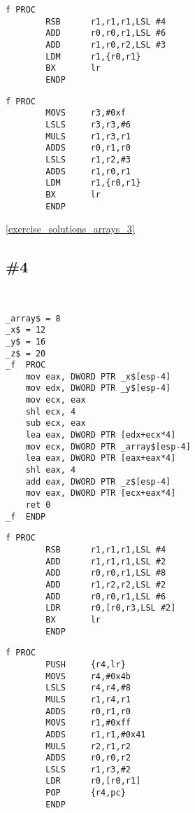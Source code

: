 \begin{lstlisting}[caption=\NonOptimizingKeilVI (\ARMMode)]
f PROC
        RSB      r1,r1,r1,LSL #4
        ADD      r0,r0,r1,LSL #6
        ADD      r1,r0,r2,LSL #3
        LDM      r1,{r0,r1}
        BX       lr
        ENDP
\end{lstlisting}

\begin{lstlisting}[caption=\NonOptimizingKeilVI (\ThumbMode)]
f PROC
        MOVS     r3,#0xf
        LSLS     r3,r3,#6
        MULS     r1,r3,r1
        ADDS     r0,r1,r0
        LSLS     r1,r2,#3
        ADDS     r1,r0,r1
        LDM      r1,{r0,r1}
        BX       lr
        ENDP
\end{lstlisting}

\Answer\: \ref{exercise_solutions_arrays_3}

\subsection{\Exercise \#4}
\label{exercise_array_4}

\WhatThisCodeDoes\


\begin{lstlisting}[caption=\Optimizing MSVC 2010]
_array$ = 8	
_x$ = 12	
_y$ = 16	
_z$ = 20	
_f	PROC
	mov	eax, DWORD PTR _x$[esp-4]
	mov	edx, DWORD PTR _y$[esp-4]
	mov	ecx, eax
	shl	ecx, 4
	sub	ecx, eax
	lea	eax, DWORD PTR [edx+ecx*4]
	mov	ecx, DWORD PTR _array$[esp-4]
	lea	eax, DWORD PTR [eax+eax*4]
	shl	eax, 4
	add	eax, DWORD PTR _z$[esp-4]
	mov	eax, DWORD PTR [ecx+eax*4]
	ret	0
_f	ENDP
\end{lstlisting}

\begin{lstlisting}[caption=\NonOptimizingKeilVI (\ARMMode)]
f PROC
        RSB      r1,r1,r1,LSL #4
        ADD      r1,r1,r1,LSL #2
        ADD      r0,r0,r1,LSL #8
        ADD      r1,r2,r2,LSL #2
        ADD      r0,r0,r1,LSL #6
        LDR      r0,[r0,r3,LSL #2]
        BX       lr
        ENDP
\end{lstlisting}

\begin{lstlisting}[caption=\NonOptimizingKeilVI (\ThumbMode)]
f PROC
        PUSH     {r4,lr}
        MOVS     r4,#0x4b
        LSLS     r4,r4,#8
        MULS     r1,r4,r1
        ADDS     r0,r1,r0
        MOVS     r1,#0xff
        ADDS     r1,r1,#0x41
        MULS     r2,r1,r2
        ADDS     r0,r0,r2
        LSLS     r1,r3,#2
        LDR      r0,[r0,r1]
        POP      {r4,pc}
        ENDP
\end{lstlisting}


